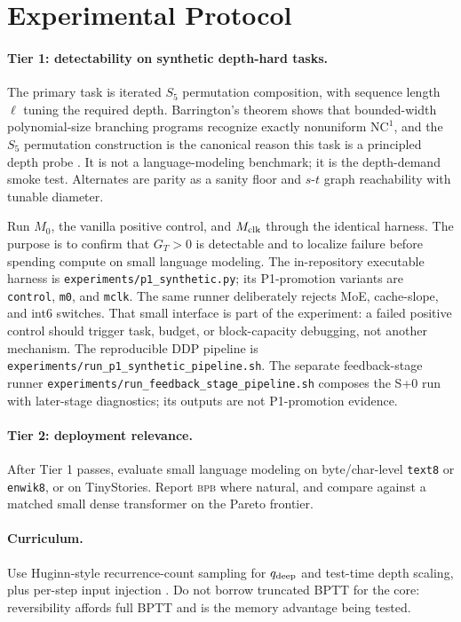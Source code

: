 \documentclass[11pt]{article}
\newcommand{\bpb}{\textsc{bpb}}
\newcommand{\code}[1]{\texttt{#1}}
\begin{document}
\section{Experimental Protocol}
\label{sec:protocol}

\paragraph{Tier 1: detectability on synthetic depth-hard tasks.}
The primary task is iterated \(S_5\) permutation composition, with sequence length \(\ell\) tuning
the required depth.  Barrington's theorem shows that bounded-width polynomial-size branching
programs recognize exactly nonuniform \(\mathrm{NC}^1\), and the \(S_5\) permutation construction
is the canonical reason this task is a principled depth probe \cite{barrington}.  It is not a
language-modeling benchmark; it is the depth-demand smoke test.  Alternates are parity as a sanity
floor and \(s\)-\(t\) graph reachability with tunable diameter.

Run \(M_0\), the vanilla positive control, and \(M_{\rm clk}\) through the identical harness.  The
purpose is to confirm that \(G_T>0\) is detectable and to localize failure before spending compute
on small language modeling.  The in-repository executable harness is
\code{experiments/p1\_synthetic.py}; its P1-promotion variants are \code{control}, \code{m0}, and
\code{mclk}.  The same runner deliberately rejects MoE, cache-slope, and int6 switches.  That
small interface is part of the experiment: a failed positive control should trigger task, budget,
or block-capacity debugging, not another mechanism.  The reproducible DDP pipeline is
\code{experiments/run\_p1\_synthetic\_pipeline.sh}.  The separate feedback-stage runner
\code{experiments/run\_feedback\_stage\_pipeline.sh} composes the S+0 run with later-stage
diagnostics; its outputs are not P1-promotion evidence.

\paragraph{Tier 2: deployment relevance.}
After Tier 1 passes, evaluate small language modeling on byte/char-level \code{text8} or
\code{enwik8}, or on TinyStories.  Report \bpb{} where natural, and compare against a matched small
dense transformer on the Pareto frontier.

\paragraph{Curriculum.}
Use Huginn-style recurrence-count sampling for \(q_{\rm deep}\) and test-time depth scaling, plus
per-step input injection \cite{huginn}.  Do not borrow truncated BPTT for the core: reversibility
affords full BPTT and is the memory advantage being tested.
\end{document}
